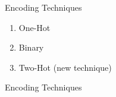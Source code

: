 \begin{frame}[fragile]{Encoding Techniques}
\begin{enumerate}
\item One-Hot
\item Binary
\item \alert{Two-Hot} (new technique)
\end{enumerate}

\end{frame}

\begin{frame}[fragile]{Encoding Techniques}
\end{frame}

%
%
%
%


